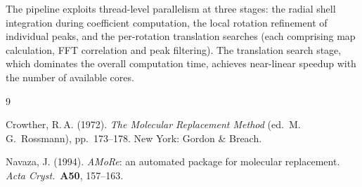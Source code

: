 The pipeline exploits thread-level parallelism at three stages: the
radial shell integration during coefficient computation, the local
rotation refinement of individual peaks, and the per-rotation
translation searches (each comprising map calculation, FFT correlation
and peak filtering). The translation search stage, which dominates the
overall computation time, achieves near-linear speedup with the number
of available cores.

\begin{thebibliography}{9}

Crowther, R.\,A. (1972).
\textit{The Molecular Replacement Method}
(ed.\ M.\,G.\ Rossmann), pp.\ 173--178. New York: Gordon \& Breach.

Navaza, J. (1994).
\textit{AMoRe}: an automated package for molecular replacement.
\textit{Acta Cryst.}\ \textbf{A50}, 157--163.

\end{thebibliography}
